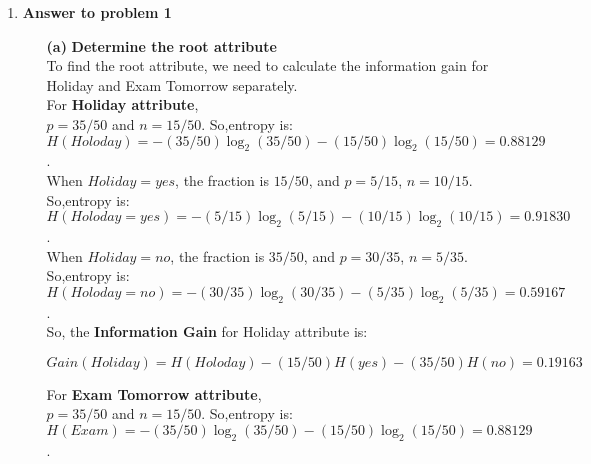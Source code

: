 

\usepackage{listings}
\usepackage{graphicx,amssymb,amsmath, listings}
\usepackage{float}
\lstset{breaklines}
\lstset{extendedchars=false}

\oddsidemargin 0in
\evensidemargin 0in
\textwidth 6.5in
\topmargin -0.5in
\textheight 9.0in




\pagestyle{myheadings}  %

\begin{enumerate}
\item {\bf Answer to problem 1}

\begin{enumerate}
\item[{\bf (a)}] {\bf Determine the root attribute}\\

To find the root attribute, we need to calculate the information gain for Holiday and Exam Tomorrow separately.\\

For {\bf Holiday attribute},\\

$p = 35/50$ and $n = 15/50$. So,entropy is: $H(Holoday) = -(35/50)\log_2(35/50)-(15/50)\log_2(15/50) = 0.88129$.\\

When $Holiday = yes$, the fraction is $15/50$, and $p = 5/15$, $n = 10/15$. So,entropy is: $H(Holoday=yes) = -(5/15)\log_2(5/15)-(10/15)\log_2(10/15) = 0.91830$.\\

When $Holiday = no$, the fraction is $35/50$, and $p = 30/35$, $n = 5/35$. So,entropy is: $H(Holoday=no) = -(30/35)\log_2(30/35)-(5/35)\log_2(5/35) = 0.59167$.\\

So, the {\bf Information Gain} for Holiday attribute is:\\
\begin{center}
$Gain(Holiday) = H(Holoday) - (15/50)H(yes)-(35/50)H(no) = 0.19163$\\
\end{center}

For {\bf Exam Tomorrow attribute},\\

$p = 35/50$ and $n = 15/50$. So,entropy is: $H(Exam) = -(35/50)\log_2(35/50)-(15/50)\log_2(15/50) = 0.88129$.\\


\end{enumerate}
\end{enumerate}
